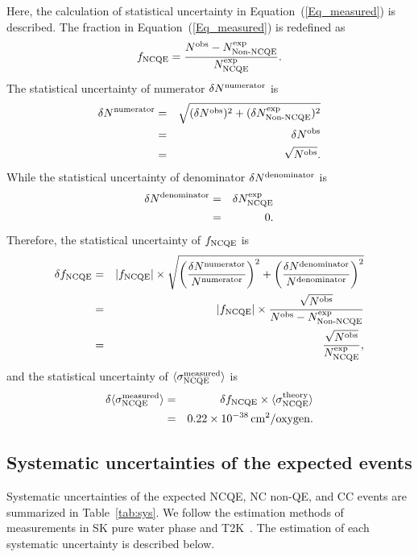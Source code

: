 Here, the calculation of statistical uncertainty in Equation~(\ref{Eq_measured}) is described.
The fraction in Equation~(\ref{Eq_measured}) is redefined as
\begin{eqnarray}
	f_{\rm NCQE} = \frac{N^{\rm obs}-N^{\rm exp}_{\rm Non\mathchar`-NCQE}}{N^{\rm exp}_{\rm NCQE}}.\label{Eq_f_NCQE}
\end{eqnarray}
The statistical uncertainty of numerator $\delta N^{\rm numerator}$ is
\begin{eqnarray}
	\delta N^{\rm numerator} &=& \sqrt{(\delta N^{\rm obs})^{2} + (\delta N^{\rm exp}_{\rm Non\mathchar`-NCQE})^{2}} \nonumber \\
													 &=& \delta N^{\rm obs} \nonumber \\
													 &=& \sqrt{N^{\rm obs}}.
\end{eqnarray}
While the statistical uncertainty of denominator $\delta N^{\rm denominator}$ is
\begin{eqnarray}
	\delta N^{\rm denominator} &=& \delta N^{\rm exp}_{\rm NCQE} \nonumber \\
														 &=& 0.
\end{eqnarray}
Therefore, the statistical uncertainty of $f_{\rm NCQE}$ is
\begin{eqnarray}
	\delta f_{\rm NCQE} &=& |f_{\rm NCQE}| \times \sqrt{\bigg({\delta N^{\rm numerator} \over  N^{\rm numerator}}\bigg)^{2} + \bigg({\delta N^{\rm denominator} \over N^{\rm denominator}}\bigg)^{2}} \nonumber \\
											&=& |f_{\rm NCQE}| \times {\sqrt{N^{\rm obs}} \over N^{\rm obs}-N^{\rm exp}_{\rm Non\mathchar`-NCQE}} \nonumber \\
											&=& {\sqrt{N^{\rm obs}} \over N^{\rm exp}_{\rm NCQE}},
\end{eqnarray}
and the statistical uncertainty of $\langle \sigma^{\rm measured}_{\rm NCQE} \rangle$ is 
\begin{eqnarray}
	\delta \langle \sigma^{\rm measured}_{\rm NCQE} \rangle &=& \delta f_{\rm NCQE} \times \langle \sigma^{\rm theory}_{\rm NCQE} \rangle \nonumber \\
																													&=& 0.22 \times 10^{-38}\,{\rm cm}^{2}/{\rm oxygen}.
\end{eqnarray}





\subsection{Systematic uncertainties of the expected events}\label{SYSTEM}
\vs\hs
Systematic uncertainties of the expected NCQE, NC non-QE, and CC events are summarized in Table~\ref{tab:sys}.
We follow the estimation methods of measurements in SK pure water phase and T2K~\cite{2019Linyan,2014Abe,2019Abe}.
The estimation of each systematic uncertainty is described below.\\

